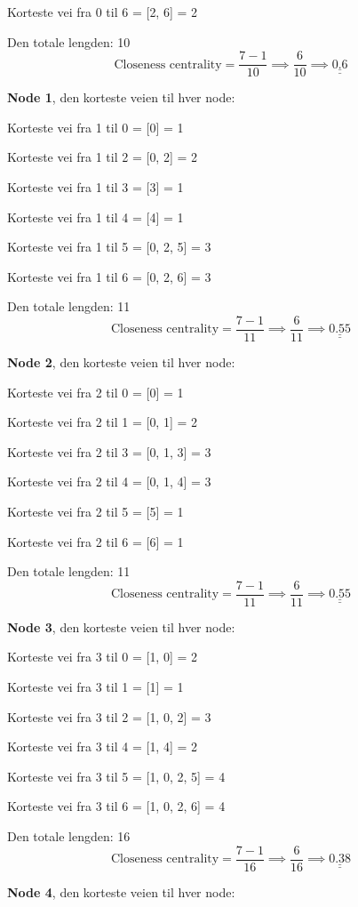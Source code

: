 \documentclass[11pt]{article}
\begin{document}
Korteste vei fra 0 til 6 = {[}2, 6{]} = 2

Den totale lengden: 10
\[\text{Closeness centrality} = \frac{7 - 1}{10} \implies \frac{6}{10} \implies\underline{\underline{ 0.6 }}\]

\textbf{Node 1}, den korteste veien til hver node:

Korteste vei fra 1 til 0 = {[}0{]} = 1

Korteste vei fra 1 til 2 = {[}0, 2{]} = 2

Korteste vei fra 1 til 3 = {[}3{]} = 1

Korteste vei fra 1 til 4 = {[}4{]} = 1

Korteste vei fra 1 til 5 = {[}0, 2, 5{]} = 3

Korteste vei fra 1 til 6 = {[}0, 2, 6{]} = 3

Den totale lengden: 11
\[\text{Closeness centrality} = \frac{7 - 1}{11} \implies \frac{6}{11} \implies\underline{\underline{ 0.55 }}\]

\textbf{Node 2}, den korteste veien til hver node:

Korteste vei fra 2 til 0 = {[}0{]} = 1

Korteste vei fra 2 til 1 = {[}0, 1{]} = 2

Korteste vei fra 2 til 3 = {[}0, 1, 3{]} = 3

Korteste vei fra 2 til 4 = {[}0, 1, 4{]} = 3

Korteste vei fra 2 til 5 = {[}5{]} = 1

Korteste vei fra 2 til 6 = {[}6{]} = 1

Den totale lengden: 11
\[\text{Closeness centrality} = \frac{7 - 1}{11} \implies \frac{6}{11} \implies\underline{\underline{ 0.55 }}\]

\textbf{Node 3}, den korteste veien til hver node:

Korteste vei fra 3 til 0 = {[}1, 0{]} = 2

Korteste vei fra 3 til 1 = {[}1{]} = 1

Korteste vei fra 3 til 2 = {[}1, 0, 2{]} = 3

Korteste vei fra 3 til 4 = {[}1, 4{]} = 2

Korteste vei fra 3 til 5 = {[}1, 0, 2, 5{]} = 4

Korteste vei fra 3 til 6 = {[}1, 0, 2, 6{]} = 4

Den totale lengden: 16
\[\text{Closeness centrality} = \frac{7 - 1}{16} \implies \frac{6}{16} \implies\underline{\underline{ 0.38 }}\]

\textbf{Node 4}, den korteste veien til hver node:
\end{document}
